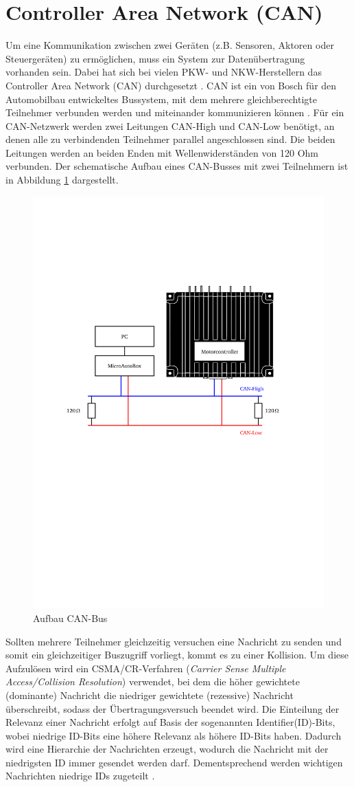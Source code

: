 \section{Controller Area Network (CAN)}\label{sec:CAN_KAP2}
Um eine Kommunikation zwischen zwei Geräten (z.B. Sensoren, Aktoren oder Steuergeräten) zu ermöglichen, muss ein System zur Datenübertragung vorhanden sein. Dabei hat sich bei vielen PKW- und NKW-Herstellern  das Controller Area Network (CAN) durchgesetzt \cite[S.57]{Werner2014}. CAN ist ein von Bosch für den Automobilbau entwickeltes Bussystem, mit dem mehrere gleichberechtigte Teilnehmer verbunden werden und miteinander kommunizieren können \cite[S. 278]{Woern2006}.
Für ein CAN-Netzwerk werden zwei Leitungen CAN-High und CAN-Low benötigt, an denen alle zu verbindenden Teilnehmer parallel angeschlossen sind. Die beiden Leitungen werden an beiden Enden mit Wellenwiderständen von 120 Ohm verbunden. Der schematische Aufbau eines CAN-Busses mit zwei Teilnehmern ist in Abbildung \ref{fig:CAN} dargestellt.\\
\begin{figure}[h]
	\centering
		\includegraphics[width=0.7\columnwidth]{Bilder/CAN2.pdf}
	\caption{Aufbau CAN-Bus \cite[S.158]{manual}}
	\label{fig:CAN}
\end{figure} \noindent
Sollten mehrere Teilnehmer gleichzeitig versuchen eine Nachricht zu senden und somit ein gleichzeitiger Buszugriff vorliegt, kommt es zu einer Kollision. Um diese Aufzulösen wird ein CSMA/CR-Verfahren (\textit{Carrier Sense Multiple Access/Collision Resolution}) verwendet, bei dem die höher gewichtete (dominante) Nachricht die niedriger gewichtete (rezessive) Nachricht überschreibt, sodass der Übertragungsversuch beendet wird. Die Einteilung der Relevanz einer Nachricht erfolgt auf Basis der sogenannten Identifier(ID)-Bits, wobei niedrige ID-Bits eine höhere Relevanz als höhere ID-Bits haben. Dadurch wird eine Hierarchie der Nachrichten erzeugt, wodurch die Nachricht mit der niedrigsten ID immer gesendet werden darf. Dementsprechend werden wichtigen Nachrichten niedrige IDs zugeteilt \cite{Lawrenz2010}. 
